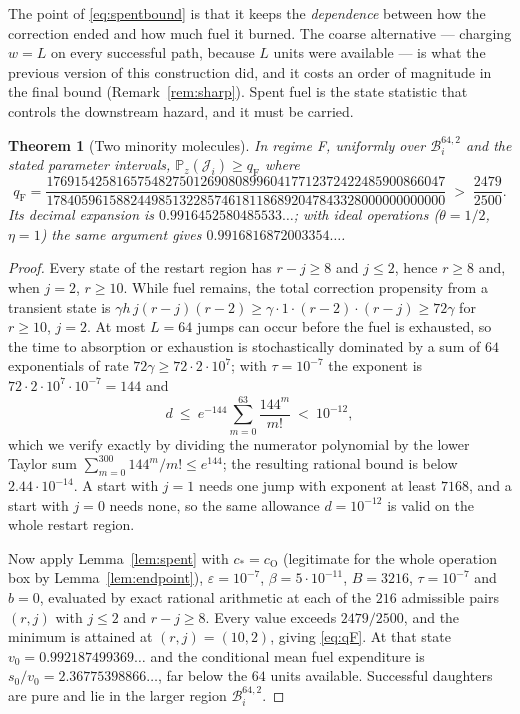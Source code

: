 \documentclass[11pt,a4paper]{article}
\theoremstyle{plain}
\newtheorem{theorem}{Theorem}[section]
\theoremstyle{definition}
\theoremstyle{remark}
\newcommand{\Prob}{\mathbb P}
\newcommand{\B}{\mathcal B}
\newcommand{\eps}{\varepsilon}
\begin{document}
The point of \eqref{eq:spentbound} is that it keeps the \emph{dependence} between how the
correction ended and how much fuel it burned. The coarse alternative --- charging
$w=L$ on every successful path, because $L$ units were available --- is what the previous
version of this construction did, and it costs an order of magnitude in the final bound
(Remark~\ref{rem:sharp}). Spent fuel is the state statistic that controls the downstream
hazard, and it must be carried.

\begin{theorem}[Two minority molecules]\label{thm:F}
In regime F, uniformly over $\B_i^{64,2}$ and the stated parameter intervals,
$\Prob_z(\mathcal J_i)\ge q_{\mathrm F}$ where
\begin{equation}
q_{\mathrm F}=\frac{176915425816575482750126908089960417712372422485900866047}
{178405961588244985132285746181186892047843328000000000000}
\;>\;\frac{2479}{2500}.\label{eq:qF}
\end{equation}
Its decimal expansion is $0.9916452580485533\ldots$; with ideal operations
($\theta=1/2$, $\eta=1$) the same argument gives $0.9916816872003354\ldots$.
\end{theorem}

\begin{proof}
Every state of the restart region has $r-j\ge8$ and $j\le2$, hence $r\ge8$ and, when
$j=2$, $r\ge10$. While fuel remains, the total correction propensity from a transient
state is $\gamma h\,j(r-j)(r-2)\ge \gamma\cdot1\cdot(r-2)\cdot(r-j)\ge72\gamma$ for
$r\ge10$, $j=2$. At most $L=64$ jumps can occur before the fuel is exhausted, so the time
to absorption or exhaustion is stochastically dominated by a sum of $64$ exponentials of
rate $72\gamma\ge72\cdot2\cdot10^{7}$; with $\tau=10^{-7}$ the exponent is
$72\cdot2\cdot10^{7}\cdot10^{-7}=144$ and
\begin{equation}
d\ \le\ e^{-144}\sum_{m=0}^{63}\frac{144^{m}}{m!}\ <\ 10^{-12},\label{eq:clock64}
\end{equation}
which we verify exactly by dividing the numerator polynomial by the lower Taylor sum
$\sum_{m=0}^{300}144^{m}/m!\le e^{144}$; the resulting rational bound is below
$2.44\cdot10^{-14}$. A start with $j=1$ needs one jump with exponent at least $7168$, and
a start with $j=0$ needs none, so the same allowance $d=10^{-12}$ is valid on the whole
restart region.

Now apply Lemma~\ref{lem:spent} with $c_*=c_{\mathrm O}$ (legitimate for the whole
operation box by Lemma~\ref{lem:endpoint}), $\eps=10^{-7}$, $\beta=5\cdot10^{-11}$,
$B=3216$, $\tau=10^{-7}$ and $b=0$, evaluated by exact rational arithmetic at each of the
$216$ admissible pairs $(r,j)$ with $j\le 2$ and $r-j\ge8$. Every value exceeds
$2479/2500$, and the minimum is attained at $(r,j)=(10,2)$, giving \eqref{eq:qF}. At that
state $v_0=0.992187499369\ldots$ and the conditional mean fuel expenditure is
$s_0/v_0=2.36775398866\ldots$, far below the $64$ units available. Successful daughters
are pure and lie in the larger region $\B_i^{64,2}$.
\end{proof}
\end{document}
